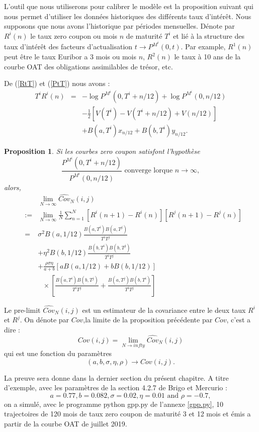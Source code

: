 \documentclass[12pt, a4paper]{book}
\newtheorem{prop}{Proposition}
\begin{document}
L'outil que nous utiliserons pour calibrer le modèle est la proposition suivant qui nous permet d'utiliser les données historiques des différents taux d'intérêt. Nous supposons que nous avons l'historique par périodes mensuelles. Dénote par $R^i(n)$ le taux zero coupon ou mois $n$ de maturité $T^i$ et lié à la structure des taux d'intérêt des facteurs d'actualisation $t\rightarrow P^{M^i}(0,t)$. Par example, $R^1(n)$ peut être le taux Euribor a 3 mois ou mois $n$, $R^2(n)$ le taux à 10 ans de la courbe OAT des obligations assimilables de trésor, etc. 

De (\ref{RtT}) et (\ref{PtT}) nous avons :
\begin{eqnarray}
T^i R^i(n)&=&-\log P^{M^i}(0,T^i+n/12)+\log P^{M^i}(0,n/12)\nonumber\\
&&-\frac{1}{2}\left[ V(T^i)-V(T^i+n/12)+V(n/12)\right]\nonumber\\
&&+B(a,T^i)x_{n/12}+B(b,T^i)y_{n/12}.\nonumber
\end{eqnarray}  

\begin{prop}
\label{CONV_LIMIT}
Si les courbes zero coupon satisfont l'hypothèse
$$\frac{P^{M^i}(0,T^i + n/12)}{P^{M^i}(0,n/12)}\mbox{ converge lorque }n\rightarrow \infty,$$
alors,
\begin{eqnarray}
& &\lim_{N\rightarrow \infty}\widehat{Cov}_N(i,j)\nonumber\\
&:= &\lim_{N\rightarrow \infty} \frac{1}{N}\sum_{n=1}^N \left[R^i(n+1)-R^i(n)\right]\left[ R^j(n+1)-R^j(n)\right]\nonumber\\
&=&\sigma^2 B(a,1/12)\frac{B(a,T^i)B(a,T^j)}{T^iT^j}\nonumber\\
& &+\eta^2 B(b,1/12)\frac{B(b,T^i)B(b,T^j)}{T^iT^j}\nonumber\\
& &+\frac{\rho\sigma\eta}{a+b}[aB(a,1/12)+bB(b,1/12)]\nonumber\\
&&\mbox{ }\times\left[\frac{B(a,T^i)B(b,T^j)}{T^iT^j}+\frac{B(a,T^j)B(b,T^i)}{T^iT^j}\right]\nonumber
\end{eqnarray}

\end{prop}

Le pre-limit $\widehat{Cov}_N(i,j)$ est un estimateur de la covariance entre le deux taux $R^i$ et $R^j$.
On dénote par $Cov$,la limite de la proposition précédente par $Cov$, c'est a dire :
$$Cov(i, j) = \lim_{N\rightarrow infty} \widehat{Cov}_N(i,j)$$
qui est une fonction du paramètres
$$(a, b, \sigma, \eta, \rho) \rightarrow Cov(i,j).$$

 La preuve sera donne dans la dernier section du présent chapitre. A titre d'exemple, avec les paramètres de la section 4.2.7 de Brigo et Mercurio \cite{BM} : 
$$a = 0.77, b = 0.082, \sigma = 0.02, \eta= 0.01 \mbox{ and }\rho = -0.7,$$
on a simulé,  avec le programme python gpp.py de l'annexe \ref{gpp.py}, 10 trajectoires de 120 mois de taux zero coupon de maturité 3 et 12 mois et émis a partir de la courbe OAT de juillet 2019. 
\end{document}
